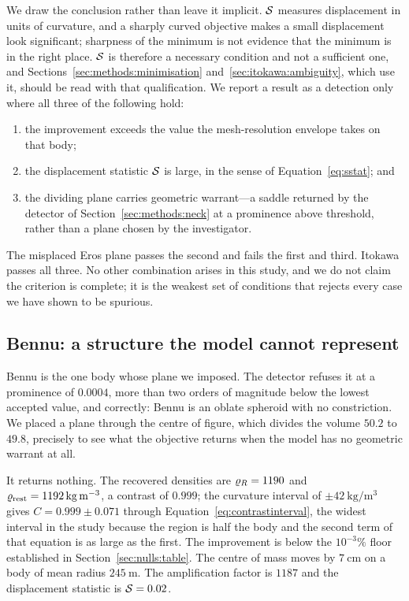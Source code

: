 We draw the conclusion rather than leave it implicit. $\mathcal{S}$ measures
displacement in units of curvature, and a sharply curved objective makes
a small displacement look significant; sharpness of the minimum is not
evidence that the minimum is in the right place. $\mathcal{S}$ is therefore a
necessary condition and not a sufficient one, and
Sections~\ref{sec:methods:minimisation} and~\ref{sec:itokawa:ambiguity},
which use it, should be read with that qualification. We report a result
as a detection only where all three of the following hold:
%
\begin{enumerate}
\item the improvement exceeds the value the mesh-resolution envelope
takes on that body;
\item the displacement statistic $\mathcal{S}$ is large, in the sense of
Equation~\eqref{eq:sstat}; and
\item the dividing plane carries geometric warrant---a saddle returned by
the detector of Section~\ref{sec:methods:neck} at a prominence above
threshold, rather than a plane chosen by the investigator.
\end{enumerate}
%
The misplaced Eros plane passes the second and fails the first and third.
Itokawa passes all three. No other combination arises in this study, and
we do not claim the criterion is complete; it is the weakest set of
conditions that rejects every case we have shown to be spurious.

\subsection{Bennu: a structure the model cannot represent}
\label{sec:nulls:bennu}

Bennu is the one body whose plane we imposed. The detector refuses it at
a prominence of $0.0004$, more than two orders of magnitude below the
lowest accepted value, and correctly: Bennu is an oblate spheroid with no
constriction. We placed a plane through the centre of figure, which
divides the volume $50.2$ to $49.8$, precisely to see what the objective
returns when the model has no geometric warrant at all.

It returns nothing. The recovered densities are $\varrho_{R} = 1190$ and
$\varrho_{\mathrm{rest}} = \SI{1192}{\kilo\gram\per\cubic\metre}$, a contrast of
$0.999$; the curvature interval of
$\pm\SI{42}{\kilo\gram\per\cubic\metre}$ gives $C = 0.999 \pm 0.071$
through Equation~\eqref{eq:contrastinterval}, the widest interval in the
study because the region is half the body and the second term of that
equation is as large as the first. The improvement is below the
$10^{-3}\%$ floor established in Section~\ref{sec:nulls:table}. The
centre of mass moves by $\SI{7}{\centi\metre}$ on a body of mean radius
$\SI{245}{\metre}$. The amplification factor is $1187$ and the
displacement statistic is $\mathcal{S} = 0.02$.

